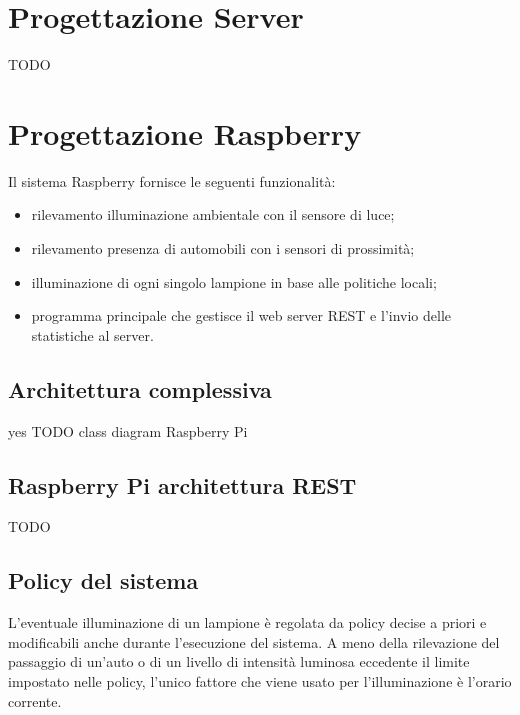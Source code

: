 \section{Progettazione Server}
TODO


\section{Progettazione Raspberry}
Il sistema Raspberry fornisce le seguenti funzionalità:
\begin{itemize}
 \item rilevamento illuminazione ambientale con il sensore di luce;
 \item rilevamento presenza di automobili con i sensori di prossimità;
 \item illuminazione di ogni singolo lampione in base alle politiche locali;
 \item programma principale che gestisce il web server REST e l'invio delle statistiche al server.
\end{itemize}

\subsection{Architettura complessiva}
yes
TODO class diagram Raspberry Pi

\subsection{Raspberry Pi architettura REST}
TODO

\subsection{Policy del sistema}
L'eventuale illuminazione di un lampione è regolata da policy decise a priori e modificabili anche durante l'esecuzione del sistema.
A meno della rilevazione del passaggio di un'auto o di un livello di intensità luminosa eccedente il limite impostato nelle policy, l'unico fattore che viene usato per l'illuminazione è l'orario corrente.
